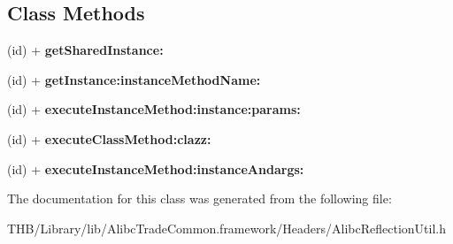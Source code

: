 \subsection*{Class Methods}
\begin{DoxyCompactItemize}
\item 
\mbox{\label{interface_alibc_reflection_util_a22e92b84d598538bec4834c8ed0da6dd}} 
(id) + {\bfseries get\+Shared\+Instance\+:}
\item 
\mbox{\label{interface_alibc_reflection_util_ad225d77c72b8f036ac989f0dc9d784f0}} 
(id) + {\bfseries get\+Instance\+:instance\+Method\+Name\+:}
\item 
\mbox{\label{interface_alibc_reflection_util_ad5145f93b9f009323c9513d3546d88c3}} 
(id) + {\bfseries execute\+Instance\+Method\+:instance\+:params\+:}
\item 
\mbox{\label{interface_alibc_reflection_util_ae5bf028cc668fba7d5407bbe7ebff37e}} 
(id) + {\bfseries execute\+Class\+Method\+:clazz\+:}
\item 
\mbox{\label{interface_alibc_reflection_util_a0b23fe47ee5ea511ce0662b41988d8e5}} 
(id) + {\bfseries execute\+Instance\+Method\+:instance\+Andargs\+:}
\end{DoxyCompactItemize}


The documentation for this class was generated from the following file\+:\begin{DoxyCompactItemize}
\item 
T\+H\+B/\+Library/lib/\+Alibc\+Trade\+Common.\+framework/\+Headers/Alibc\+Reflection\+Util.\+h\end{DoxyCompactItemize}
